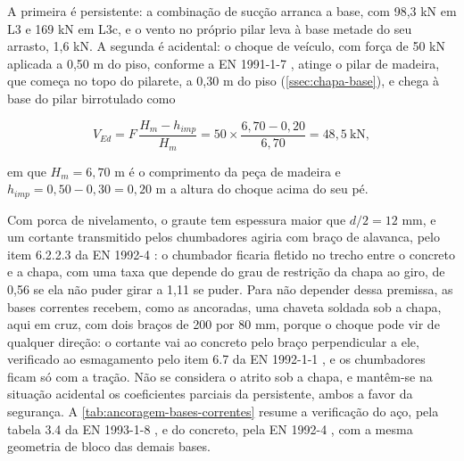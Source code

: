 A primeira é persistente: a combinação de sucção arranca a base, com 98,3 kN em
L3 e 169 kN em L3c, e o vento no próprio pilar leva à base metade do seu
arrasto, 1,6 kN. A segunda é acidental: o choque de veículo, com força de 50 kN
aplicada a 0,50 m do piso, conforme a EN 1991-1-7 \cite{EN1991-1-7:2006}, atinge o
pilar de madeira, que começa no topo do pilarete, a 0,30 m do piso
(\autoref{ssec:chapa-base}), e chega à base do pilar birrotulado como

\begin{equation}
    V_{Ed} = F\,\frac{H_m - h_{imp}}{H_m}
           = 50 \times \frac{6{,}70 - 0{,}20}{6{,}70} = 48{,}5~\text{kN},
    \label{eq:corte-impacto}
\end{equation}

\noindent
em que $H_m = 6{,}70$ m é o comprimento da peça de madeira e
$h_{imp} = 0{,}50 - 0{,}30 = 0{,}20$ m a altura do choque acima do seu pé.

\noindent
Com porca de nivelamento, o graute tem espessura maior que $d/2 = 12$ mm, e um
cortante transmitido pelos chumbadores agiria com braço de alavanca, pelo item
6.2.2.3 da EN 1992-4 \cite{EN1992-4:2018}: o chumbador ficaria fletido no trecho
entre o concreto e a chapa, com uma taxa que depende do grau de restrição da
chapa ao giro, de 0,56 se ela não puder girar a 1,11 se puder. Para não depender
dessa premissa, as bases correntes recebem, como as ancoradas, uma chaveta
soldada sob a chapa, aqui em cruz, com dois braços de 200 por 80 mm, porque o
choque pode vir de qualquer direção: o cortante vai ao concreto pelo braço
perpendicular a ele, verificado ao esmagamento pelo item 6.7 da
EN 1992-1-1 \cite{EN1992-1-1:2004}, e os chumbadores ficam só com a tração. Não se
considera o atrito sob a chapa, e mantêm-se na situação acidental os coeficientes
parciais da persistente, ambos a favor da segurança. A
\autoref{tab:ancoragem-bases-correntes} resume a verificação do aço, pela
tabela 3.4 da EN 1993-1-8 \cite{EN1993-1-8:2005}, e do concreto, pela
EN 1992-4 \cite{EN1992-4:2018}, com a mesma geometria de bloco das demais bases.


